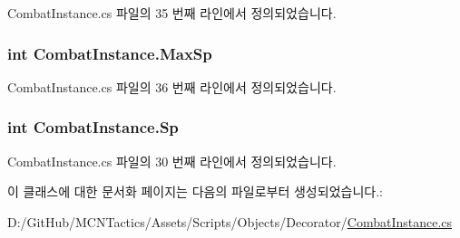 Combat\+Instance.\+cs 파일의 35 번째 라인에서 정의되었습니다.

\subsubsection[{\texorpdfstring{Max\+Sp}{MaxSp}}]{\setlength{\rightskip}{0pt plus 5cm}int Combat\+Instance.\+Max\+Sp\hspace{0.3cm}{\ttfamily [get]}}\hypertarget{class_combat_instance_ad1d6d4d72223021bd0130b069437463d}{}\label{class_combat_instance_ad1d6d4d72223021bd0130b069437463d}


Combat\+Instance.\+cs 파일의 36 번째 라인에서 정의되었습니다.

\subsubsection[{\texorpdfstring{Sp}{Sp}}]{\setlength{\rightskip}{0pt plus 5cm}int Combat\+Instance.\+Sp\hspace{0.3cm}{\ttfamily [get]}}\hypertarget{class_combat_instance_a120995296719b1fb1fa4cc55721ddba4}{}\label{class_combat_instance_a120995296719b1fb1fa4cc55721ddba4}


Combat\+Instance.\+cs 파일의 30 번째 라인에서 정의되었습니다.



이 클래스에 대한 문서화 페이지는 다음의 파일로부터 생성되었습니다.\+:\begin{DoxyCompactItemize}
\item 
D\+:/\+Git\+Hub/\+M\+C\+N\+Tactics/\+Assets/\+Scripts/\+Objects/\+Decorator/\hyperlink{_combat_instance_8cs}{Combat\+Instance.\+cs}\end{DoxyCompactItemize}
